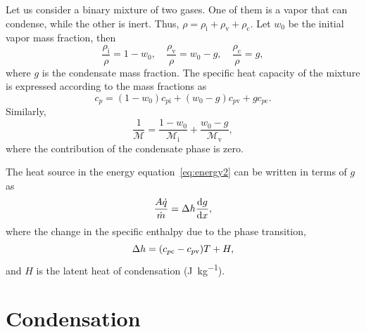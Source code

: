 \documentclass{article}
\newcommand{\vap}{\text{v}}
\newcommand{\ine}{\text{i}}
\newcommand{\con}{\text{c}}
\begin{document}
Let us consider a binary mixture of two gases.
One of them is a vapor that can condense, while the other is inert.
Thus, $\rho = \rho_\ine + \rho_\vap + \rho_\con$.
Let $w_0$ be the initial vapor mass fraction, then
\begin{equation}\label{eq:rhoM}
    \frac{\rho_\ine}{\rho} = 1-w_0, \quad \frac{\rho_\vap}{\rho} = w_0-g, \quad \frac{\rho_\con}{\rho} = g,
\end{equation}
where $g$ is the condensate mass fraction.
The specific heat capacity of the mixture is expressed according to the mass fractions as
\begin{equation}\label{eq:c_p}
    c_p = (1-w_0)c_{p\ine} + (w_0-g)c_{p\vap} + gc_{p\con}.
\end{equation}
Similarly,
\begin{equation}\label{eq:M}
    \frac1{\mathcal{M}} = \frac{1-w_0}{\mathcal{M}_\ine} + \frac{w_0-g}{\mathcal{M}_\vap},
\end{equation}
where the contribution of the condensate phase is zero.

The heat source in the energy equation~\eqref{eq:energy2} can be written in terms of $g$ as
\begin{equation}\label{eq:dotq}
    \frac{A\dot{q}}{\dot{m}} = \Delta{h}\dv{g}{x},
\end{equation}
where the change in the specific enthalpy due to the phase transition,
\begin{equation}\label{eq:deltah}
    \Delta{h} = \qty(c_{p\con} - c_{p\vap})T + H,
\end{equation}
and $H$ is the latent heat of condensation (\si{\J\per\kg}).

\section{Condensation}
\end{document}

